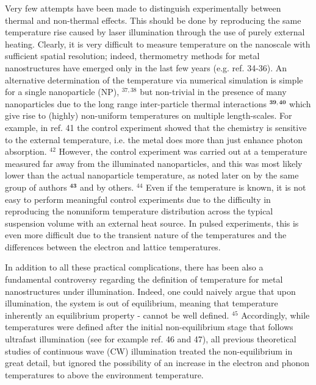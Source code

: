 \documentclass[10pt]{article}
\begin{document}
Very few attempts have been made to distinguish experimentally between thermal and non-thermal effects. This should be done by reproducing the same temperature rise caused by laser illumination through the use of purely external heating. Clearly, it is very difficult to measure temperature on the nanoscale with sufficient spatial resolution; indeed, thermometry methods for metal nanostructures have emerged only in the last few years (e.g. ref. 34-36). An alternative determination of the temperature via numerical simulation is simple for a single nanoparticle (NP), ${ }^{37,38}$ but non-trivial in the presence of many nanoparticles due to the long range inter-particle thermal interactions ${ }^{\mathbf{3 9 , 4 0}}$ which give rise to (highly) non-uniform temperatures on multiple length-scales. For example, in ref. 41 the control experiment showed that the chemistry is sensitive to the external temperature, i.e. the metal does more than just enhance photon absorption. ${ }^{42}$ However, the control experiment was carried out at a temperature measured far away from the illuminated nanoparticles, and this was most likely lower than the actual nanoparticle temperature, as noted later on by the same group of authors ${ }^{\mathbf{4 3}}$ and by others. ${ }^{44}$ Even if the temperature is known, it is not easy to perform meaningful control experiments due to the difficulty in reproducing the nonuniform temperature distribution across the typical suspension volume with an external heat source. In pulsed experiments, this is even more difficult due to the transient nature of the temperatures and the differences between the electron and lattice temperatures.

In addition to all these practical complications, there has been also a fundamental controversy regarding the definition of temperature for metal nanostructures under illumination. Indeed, one could naively argue that upon illumination, the system is out of equilibrium, meaning that temperature inherently an equilibrium property - cannot be well defined. ${ }^{45}$ Accordingly, while temperatures were defined after the initial non-equilibrium stage that follows ultrafast illumination (see for example ref. 46 and 47), all previous theoretical studies of continuous wave (CW) illumination treated the non-equilibrium in great detail, but ignored the possibility of an increase in the electron and phonon temperatures to above the environment temperature.
\end{document}
